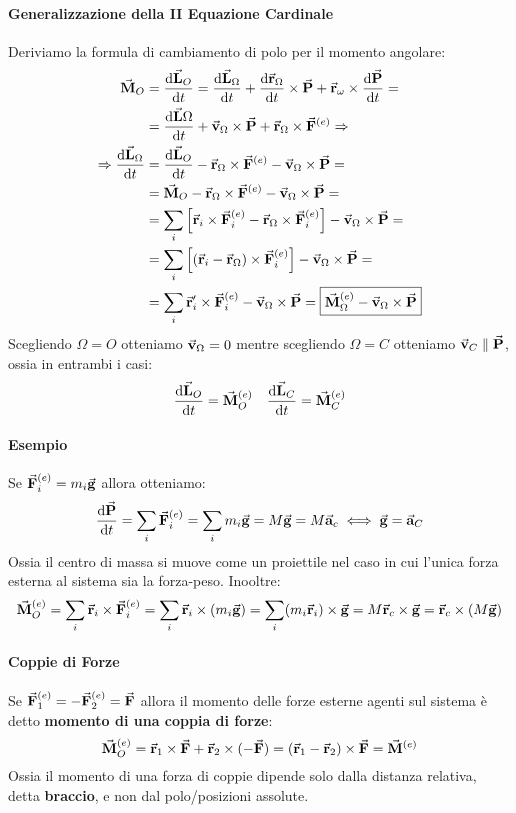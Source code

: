\documentclass{article}
\newcommand{\then}{\ensuremath{\Rightarrow}}
\renewcommand{\a}{\va{a}}
\renewcommand{\v}{\va{v}}
\renewcommand{\r}{\va{r}}
\newcommand{\g}{\va{g}}
\newcommand{\F}{\va{F}}
\newcommand{\M}{\va{M}}
\renewcommand{\P}{\va{P}}
\renewcommand{\L}{\va{L}}
\begin{document}
\paragraph{Generalizzazione della II Equazione Cardinale}
Deriviamo la formula di cambiamento di polo per il momento angolare:
\begin{equation}
\begin{split}
    \M_O&=\dv{\L_O}{t}=\dv{\L_{\Omega}}{t}+\dv{\r_{\Omega}}{t}\times\P+\r_{\omega}\times\dv{\P}{t}=\\
    &=\dv{\L{\Omega}}{t}+\v_{\Omega}\times\P+\r_{\Omega}\times\F^{(e)}\then\\
    \then \dv{\L_{\Omega}}{t}&=\dv{\L_O}{t}-\r_{\Omega}\times\F^{(e)}-\v_{\Omega}\times\P=\\
    &=\M_O-\r_{\Omega}\times\F^{(e)}-\v_{\Omega}\times\P=\\
    &=\sum_i\left[\r_i\times\F_i^{(e)}-\r_{\Omega}\times\F_i^{(e)}\right]-\v_{\Omega}\times\P=\\
    &=\sum_i\left[(\r_i-\r_{\Omega})\times\F_i^{(e)}\right]-\v_{\Omega}\times\P=\\
    &=\sum_i\r_i'\times\F_i^{(e)}-\v_{\Omega}\times\P=\boxed{\M_{\Omega}^{(e)}-\v_{\Omega}\times\P}
\end{split}
\end{equation}
Scegliendo $\Omega=O$ otteniamo $\v_{\Omega}=0$ mentre scegliendo $\Omega=C$ otteniamo $\v_C\parallel\P$, ossia in entrambi i casi:
\[\dv{\L_O}{t}=\M_O^{(e)}\quad\dv{\L_C}{t}=\M_C^{(e)}\]


\paragraph{Esempio}
Se $\F_i^{(e)}=m_i\g$ allora otteniamo:
\[\dv{\P}{t}=\sum_i\F_i^{(e)}=\sum_im_i\g=M\g=M\a_c\iff \g=\a_C\]
Ossia il centro di massa si muove come un proiettile nel caso in cui l'unica forza esterna al sistema sia la forza-peso. Inooltre:
\[\M_O^{(e)}=\sum_i\r_i\times\F_i^{(e)}=\sum_i\r_i\times(m_i\g)=\sum_i(m_i\r_i)\times\g=M\r_c\times\g=\r_c\times(M\g)\]
\paragraph{Coppie di Forze}
Se $\F_1^{(e)}=-\F_2^{(e)}=\F$ allora il momento delle forze esterne agenti sul sistema è detto \textbf{momento di una coppia di forze}:
\begin{equation}
    \M_O^{(e)}=\r_1\times\F+\r_2\times(-\F)=(\r_1-\r_2)\times\F=\M^{(e)}
\end{equation}
Ossia il momento di una forza di coppie dipende solo dalla distanza relativa, detta \textbf{braccio}, e non dal polo/posizioni assolute.
\end{document}
